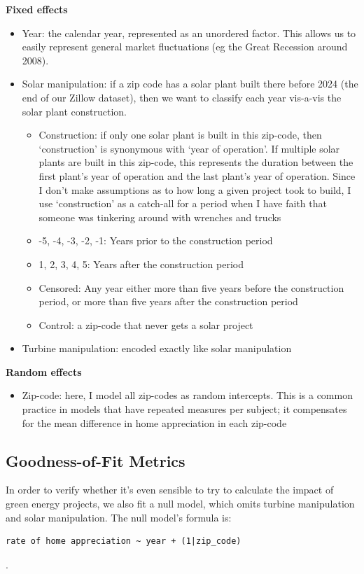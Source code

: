 \documentclass{article}
\begin{document}
\textbf{Fixed effects}
\begin{itemize}
\item Year: the calendar year, represented as an unordered factor. This allows us to easily represent general market fluctuations (eg the Great Recession around 2008).
\item Solar manipulation: if a zip code has a solar plant built there before 2024 (the end of our Zillow dataset), then we want to classify each year vis-a-vis the solar plant construction. 
	\begin{itemize}
	\item Construction: if only one solar plant is built in this zip-code, then `construction' is synonymous with `year of operation'. If multiple solar plants are built in this zip-code, this represents the duration between the first plant's year of operation and the last plant's year of operation. Since I don't make assumptions as to how long a given project took to build, I use `construction' as a catch-all for a period when I have faith that someone was tinkering around with wrenches and trucks
	\item -5, -4, -3, -2, -1: Years prior to the construction period
	\item 1, 2, 3, 4, 5: Years after the construction period
	\item Censored: Any year either more than five years before the construction period, or more than five years after the construction period
	\item Control: a zip-code that never gets a solar project
	\end{itemize}
\item Turbine manipulation: encoded exactly like solar manipulation
\end{itemize}
\textbf{Random effects}
\begin{itemize}
\item Zip-code: here, I model all zip-codes as random intercepts. This is a common practice in models that have repeated measures per subject; it compensates for the mean difference in home appreciation in each zip-code
\end{itemize}


\subsection{Goodness-of-Fit Metrics}
In order to verify whether it's even sensible to try to calculate the impact of green energy projects, we also fit a null model, which omits turbine manipulation and solar manipulation.
The null model's formula is:
\begin{verbatim}
rate of home appreciation ~ year + (1|zip_code)
\end{verbatim}
.
\end{document}
